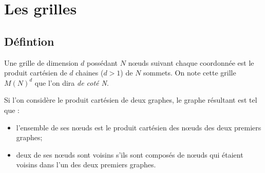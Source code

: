 \section{Les grilles}

\subsection{Défintion}

\begin{dfn}
Une grille de dimension $d$ possédant $N$ nœuds suivant chaque coordonnée est le produit cartésien de $d$ chaines ($d>1$) de $N$ sommets. On note cette grille $M(N)^d$ que l'on dira \textit{de coté N}.
\end{dfn}




\begin{rem}

Si l'on considère le produit cartésien de deux graphes, le graphe résultant est tel que :
\begin{itemize}
\item l'ensemble de ses nœuds est le produit cartésien des nœuds des deux premiers graphes;
\item deux de ses nœuds sont voisins s'ils sont composés de nœuds qui étaient voisins dans l'un des deux premiers graphes.
\end{itemize}

\end{rem}

